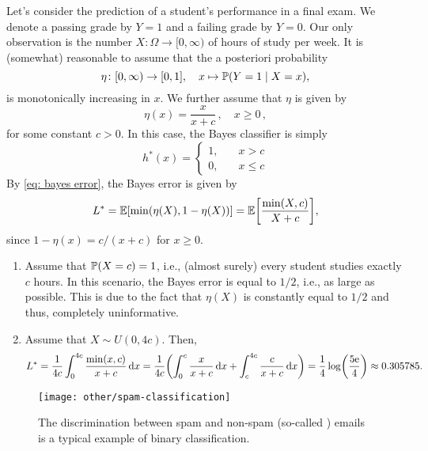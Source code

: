 \begin{example}
Let's consider the prediction of a student's performance in a final exam. We denote a passing grade by $Y = 1$ and a failing grade by $Y = 0$. Our only observation is the number $X \colon \Omega \to [0, \infty)$ of hours of study per week. It is (somewhat) reasonable to assume that the a posteriori probability
\[
    \eta \colon [0, \infty) \to [0, 1], \quad x \mapsto \P(Y = 1 \given X = x),
\]
is monotonically increasing in $x$. We further assume that $\eta$ is given by
\[
    \eta(x) = \frac{x}{x + c} \, , \quad x \geq 0 \, ,
\]
for some constant $c > 0$. In this case, the Bayes classifier is simply
\[
    h^*(x) = \begin{cases}
        1, \quad & x > c \\
        0, \quad & x \leq c
    \end{cases}
\]
By \eqref{eq: bayes error}, the Bayes error is given by
\[
    L^* = \Exp[\min(\eta(X), 1 - \eta(X))] = \Exp\left[\frac{\min(X, c)}{X + c}\right],
\]
since $1 - \eta(x) = c / (x+c)$ for $x \geq 0$.

\begin{enumerate}
    \item Assume that $\P(X = c) = 1$, i.e., (almost surely) every student studies exactly $c$ hours. In this scenario, the Bayes error is equal to $1/2$, i.e., as large as possible. This is due to the fact that $\eta(X)$ is constantly equal to $1/2$ and thus, completely uninformative.
    
    \item Assume that $X \sim U(0, 4c)$. Then,
    \[
        L^* = \frac{1}{4c} \int_0^{4c} \frac{\min(x, c)}{x + c} \dx = \frac{1}{4c} \left( \int_0^c \frac{x}{x + c} \dx + \int_c^{4c} \frac{c}{x + c} \dx \right) = \frac{1}{4} \log(\frac{5\e}{4}) \approx 0.305785.
    \]
\end{enumerate}
\end{example}

\begin{figure}
    \centering
    \texttt{[image: other/spam-classification]}
    \caption{%
        The discrimination between spam and non-spam (so-called ) emails is a typical example of binary classification.
    }
    \label{fig: spam classification}
\end{figure}

